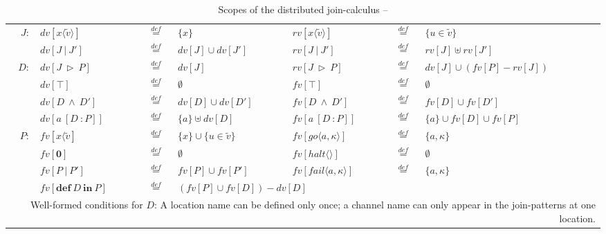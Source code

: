 \begin{table}[h]
  \begin{center}
  \begin{tabular}{ r l c l  l  c l  }
  $J:$&$dv[x\langle\widetilde{v}\rangle]$&$\overset{def}{=}$&$\{x\}$& $rv[x\langle\widetilde{v}\rangle]$&$\overset{def}{=}$&$\{u \in \widetilde{v}\}$\\
  &$dv[J\ |\ J']$&$\overset{def}{=}$&$dv[J]\cup dv[J']$&$rv[J\ |\ J']$&$\overset{def}{=}$&$rv[J]\uplus rv[J']$\\
  $D:$&$dv[J\ \triangleright \ P]$&$\overset{def}{=}$&$dv[J]$&$rv[J\ \triangleright \ P]$&$\overset{def}{=}$&$dv[J]\cup(fv[P]-rv[J])$\\
  &$dv[\top]$&$\overset{def}{=}$&$\emptyset$&$fv[\top]$&$\overset{def}{=}$&$\emptyset$\\
  &$dv[D\ \wedge \ D']$&$\overset{def}{=}$&$dv[D]\cup dv[D']$&$fv[D\ \wedge \ D']$&$\overset{def}{=}$&$fv[D]\cup fv[D']$\\
  &$dv[a\ [D\ : P]]$&$\overset{def}{=}$&$\{a\} \uplus dv[D]$&$fv[a\ [D\ : P]]$&$\overset{def}{=}$&$\{a\} \cup fv[D] \cup fv[P]$\\
  $P:$&$fv[x\langle\widetilde{v}]$&$\overset{def}{=}$&$\{x\}\cup\{u\in\widetilde{v}\}$&$fv[go\langle a, \kappa \rangle]$&$\overset{def}{=}$&$\{a,\kappa\}$\\
  &$fv[\mathbf{0}]$&$\overset{def}{=}$&$\emptyset$&$fv[halt\langle\rangle]$&$\overset{def}{=}$&$\emptyset$\\
  &$fv[P\ |\ P']$&$\overset{def}{=}$&$fv[P]\cup fv[P']$&$fv[fail\langle a, \kappa \rangle]$&$\overset{def}{=}$&$\{a,\kappa\}$\\
  &$fv[ \mathbf{def}\ D\ \mathbf{in}\ P]$&$\overset{def}{=}$&\multicolumn{2}{l}{$(fv[P]\cup fv[D])-dv[D]$}\\
  \multicolumn{7}{p{\textwidth}}{Well-formed conditions for $D$: A location name can be defined only once; a channel name can only appear in the join-patterns at one location.}
  \end{tabular}
  \end{center}
  \caption{Scopes of the distributed join-calculus -- \citep{RCHAM} }
  \label{join_scope}
\end{table}

